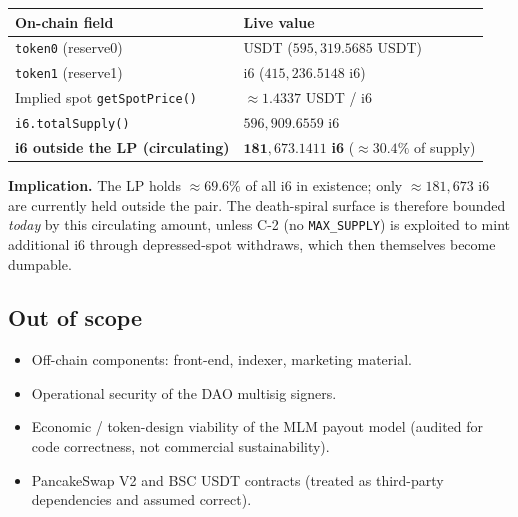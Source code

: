 \documentclass[11pt,a4paper]{article}
\begin{document}
\begin{center}
\renewcommand{\arraystretch}{1.3}
\begin{tabular}{p{6.0cm} p{6.8cm}}
\toprule
\textbf{On-chain field} & \textbf{Live value} \\
\midrule
\texttt{token0} (reserve0)            & USDT  ($595{,}319.5685$ USDT) \\
\texttt{token1} (reserve1)            & i6    ($415{,}236.5148$ i6)   \\
Implied spot \texttt{getSpotPrice()}  & $\approx 1.4337$ USDT / i6     \\
\texttt{i6.totalSupply()}             & $596{,}909.6559$ i6            \\
\textbf{i6 outside the LP (circulating)} & $\mathbf{181{,}673.1411}$ \textbf{i6} ($\approx 30.4\%$ of supply) \\
\bottomrule
\end{tabular}
\end{center}

\noindent
\textbf{Implication.} The LP holds $\approx 69.6\%$ of all i6 in existence;
only $\approx 181{,}673$ i6 are currently held outside the pair. The
death-spiral surface is therefore bounded \emph{today} by this circulating
amount, unless C-2 (no \texttt{MAX\_SUPPLY}) is exploited to mint additional
i6 through depressed-spot withdraws, which then themselves become dumpable.

\subsection{Out of scope}

\begin{itemize}[leftmargin=*]
  \item Off-chain components: front-end, indexer, marketing material.
  \item Operational security of the DAO multisig signers.
  \item Economic / token-design viability of the MLM payout model
        (audited for code correctness, not commercial sustainability).
  \item PancakeSwap V2 and BSC USDT contracts (treated as third-party
        dependencies and assumed correct).
\end{itemize}

\newpage

\end{document}
